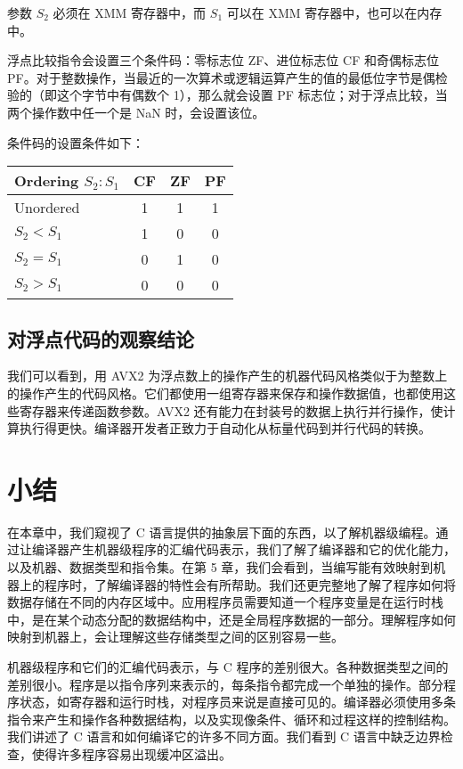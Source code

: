 参数 $S_2$ 必须在 XMM 寄存器中，而 $S_1$ 可以在 XMM 寄存器中，也可以在内存中。

浮点比较指令会设置三个条件码：零标志位 ZF、进位标志位 CF 和奇偶标志位 PF。对于整数操作，当最近的一次算术或逻辑运算产生的值的最低位字节是偶检验的（即这个字节中有偶数个 1），那么就会设置 PF 标志位；对于浮点比较，当两个操作数中任一个是 NaN 时，会设置该位。

条件码的设置条件如下：
\begin{table}[!ht]
    \centering
    \begin{tabular}{lccc}
        \toprule
        Ordering $S_2 : S_1$ & CF & ZF & PF \\
        \midrule
        Unordered & 1 & 1 & 1 \\
        $S_2 < S_1$ & 1 & 0 & 0 \\
        $S_2 = S_1$ & 0 & 1 & 0 \\
        $S_2 > S_1$ & 0 & 0 & 0 \\
        \bottomrule
    \end{tabular}
\end{table}

\subsection{对浮点代码的观察结论}

我们可以看到，用 AVX2 为浮点数上的操作产生的机器代码风格类似于为整数上的操作产生的代码风格。它们都使用一组寄存器来保存和操作数据值，也都使用这些寄存器来传递函数参数。AVX2 还有能力在封装号的数据上执行并行操作，使计算执行得更快。编译器开发者正致力于自动化从标量代码到并行代码的转换。

\section{小结}

在本章中，我们窥视了 C 语言提供的抽象层下面的东西，以了解机器级编程。通过让编译器产生机器级程序的汇编代码表示，我们了解了编译器和它的优化能力，以及机器、数据类型和指令集。在第 5 章，我们会看到，当编写能有效映射到机器上的程序时，了解编译器的特性会有所帮助。我们还更完整地了解了程序如何将数据存储在不同的内存区域中。应用程序员需要知道一个程序变量是在运行时栈中，是在某个动态分配的数据结构中，还是全局程序数据的一部分。理解程序如何映射到机器上，会让理解这些存储类型之间的区别容易一些。

机器级程序和它们的汇编代码表示，与 C 程序的差别很大。各种数据类型之间的差别很小。程序是以指令序列来表示的，每条指令都完成一个单独的操作。部分程序状态，如寄存器和运行时栈，对程序员来说是直接可见的。编译器必须使用多条指令来产生和操作各种数据结构，以及实现像条件、循环和过程这样的控制结构。我们讲述了 C 语言和如何编译它的许多不同方面。我们看到 C 语言中缺乏边界检查，使得许多程序容易出现缓冲区溢出。

